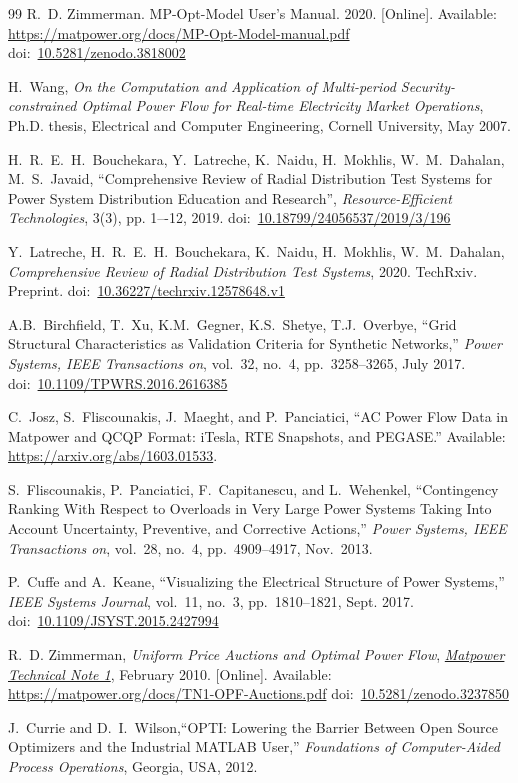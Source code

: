 \documentclass[12pt]{article}
\newcommand{\matpower}[0]{{\sc Matpower}}
\newcommand{\mpom}[0]{\mbox{MP-Opt-Model}}
\newcommand{\mpomname}[0]{\mpom{}}
\newcommand{\currentmpommanurl}[0]{https://matpower.org/docs/MP-Opt-Model-manual.pdf}
\newcommand{\TNoneurl}[0]{https://matpower.org/docs/TN1-OPF-Auctions.pdf}
\newcommand{\TNone}[0]{\href{\TNoneurl}{\it \matpower{} Technical Note 1}}
\newcommand{\doi}[1]{doi:~\href{https://doi.org/#1}{#1}}
\numberwithin{equation}{section}
\numberwithin{table}{section}
\numberwithin{figure}{section}
\begin{document}
\begin{thebibliography}{99}
R.~D. Zimmerman. \mpomname{} User's Manual. 2020. [Online]. Available: \url{\currentmpommanurl}
\doi{10.5281/zenodo.3818002}

H.~Wang, \emph{On the Computation and Application of Multi-period Security-constrained Optimal Power Flow for Real-time Electricity Market Operations}, Ph.D. thesis, Electrical and Computer Engineering, Cornell University, May 2007.

H.~R.~E.~H.~Bouchekara, Y.~Latreche, K.~Naidu, H.~Mokhlis, W.~M.~Dahalan, M.~S.~Javaid, ``Comprehensive Review of Radial Distribution Test Systems for Power System Distribution Education and Research'', \emph{Resource-Efficient Technologies}, 3(3), pp. 1–-12, 2019.
\doi{10.18799/24056537/2019/3/196}

Y.~Latreche, H.~R.~E.~H.~Bouchekara, K.~Naidu, H.~Mokhlis, W.~M.~Dahalan, \emph{Comprehensive Review of Radial Distribution Test Systems}, 2020. TechRxiv. Preprint. \doi{10.36227/techrxiv.12578648.v1}

A.B.~Birchfield, T.~Xu, K.M.~Gegner, K.S.~Shetye, T.J.~Overbye,
``Grid Structural Characteristics as Validation Criteria for Synthetic Networks,''  \emph{Power Systems, IEEE Transactions on}, vol.~32, no.~4, pp.~3258--3265, July 2017.
\doi{10.1109/TPWRS.2016.2616385}

C.~Josz, S.~Fliscounakis, J.~Maeght, and P.~Panciatici, ``AC Power
Flow Data in \matpower{} and QCQP Format: iTesla, RTE Snapshots, and PEGASE.''
Available: \url{https://arxiv.org/abs/1603.01533}.

S.~Fliscounakis, P.~Panciatici, F.~Capitanescu, and L.~Wehenkel, ``Contingency Ranking With Respect to Overloads in Very Large Power Systems Taking Into Account Uncertainty, Preventive, and Corrective Actions,'' \emph{Power Systems, IEEE Transactions on}, vol.~28, no.~4, pp.~4909--4917, Nov.~2013.

P.~Cuffe and A.~Keane, ``Visualizing the Electrical Structure of Power Systems,'' \emph{IEEE Systems Journal}, vol.~11, no.~3, pp.~1810--1821, Sept. 2017.
\doi{10.1109/JSYST.2015.2427994}

R.~D. Zimmerman, \emph{Uniform Price Auctions and Optimal Power Flow}, \TNone, February 2010. [Online]. Available: \url{\TNoneurl}
\doi{10.5281/zenodo.3237850}

J.~Currie and D.~I.~Wilson,``OPTI: Lowering the Barrier Between Open Source Optimizers and the Industrial MATLAB User,'' \emph{Foundations of Computer-Aided Process Operations}, Georgia, USA, 2012.


\end{thebibliography}
\end{document}
